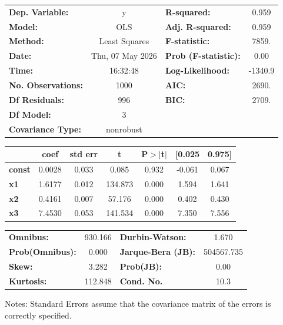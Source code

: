 \begin{center}
\begin{tabular}{lclc}
\toprule
\textbf{Dep. Variable:}    &        y         & \textbf{  R-squared:         } &     0.959   \\
\textbf{Model:}            &       OLS        & \textbf{  Adj. R-squared:    } &     0.959   \\
\textbf{Method:}           &  Least Squares   & \textbf{  F-statistic:       } &     7859.   \\
\textbf{Date:}             & Thu, 07 May 2026 & \textbf{  Prob (F-statistic):} &     0.00    \\
\textbf{Time:}             &     16:32:48     & \textbf{  Log-Likelihood:    } &   -1340.9   \\
\textbf{No. Observations:} &        1000      & \textbf{  AIC:               } &     2690.   \\
\textbf{Df Residuals:}     &         996      & \textbf{  BIC:               } &     2709.   \\
\textbf{Df Model:}         &           3      & \textbf{                     } &             \\
\textbf{Covariance Type:}  &    nonrobust     & \textbf{                     } &             \\
\bottomrule
\end{tabular}
\begin{tabular}{lcccccc}
               & \textbf{coef} & \textbf{std err} & \textbf{t} & \textbf{P$> |$t$|$} & \textbf{[0.025} & \textbf{0.975]}  \\
\midrule
\textbf{const} &       0.0028  &        0.033     &     0.085  &         0.932        &       -0.061    &        0.067     \\
\textbf{x1}    &       1.6177  &        0.012     &   134.873  &         0.000        &        1.594    &        1.641     \\
\textbf{x2}    &       0.4161  &        0.007     &    57.176  &         0.000        &        0.402    &        0.430     \\
\textbf{x3}    &       7.4530  &        0.053     &   141.534  &         0.000        &        7.350    &        7.556     \\
\bottomrule
\end{tabular}
\begin{tabular}{lclc}
\textbf{Omnibus:}       & 930.166 & \textbf{  Durbin-Watson:     } &     1.670   \\
\textbf{Prob(Omnibus):} &   0.000 & \textbf{  Jarque-Bera (JB):  } & 504567.735  \\
\textbf{Skew:}          &   3.282 & \textbf{  Prob(JB):          } &      0.00   \\
\textbf{Kurtosis:}      & 112.848 & \textbf{  Cond. No.          } &      10.3   \\
\bottomrule
\end{tabular}
\end{center}

Notes: \newline
 [1] Standard Errors assume that the covariance matrix of the errors is correctly specified.